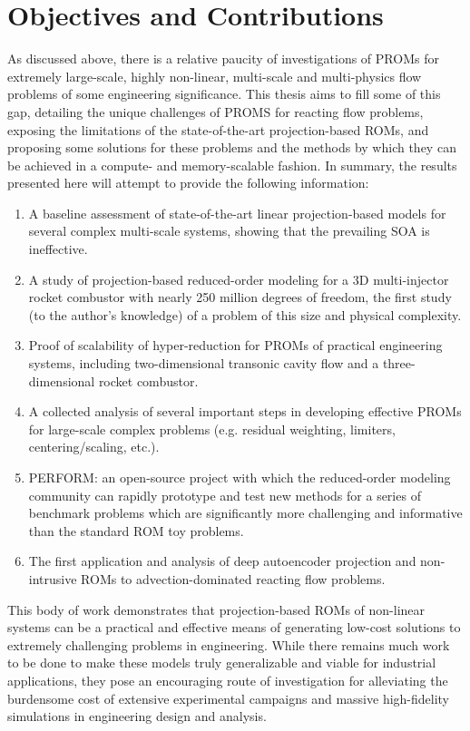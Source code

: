 \section{Objectives and Contributions}

As discussed above, there is a relative paucity of investigations of PROMs for extremely large-scale, highly non-linear, multi-scale and multi-physics flow problems of some engineering significance. This thesis aims to fill some of this gap, detailing the unique challenges of PROMS for reacting flow problems, exposing the limitations of the state-of-the-art projection-based ROMs, and proposing some solutions for these problems and the methods by which they can be achieved in a compute- and memory-scalable fashion. In summary, the results presented here will attempt to provide the following information:

\begin{enumerate}
    \item A baseline assessment of state-of-the-art linear projection-based models for several complex multi-scale systems, showing that the prevailing SOA is ineffective.
    \item A study of projection-based reduced-order modeling for a 3D multi-injector rocket combustor with nearly 250 million degrees of freedom, the first study (to the author's knowledge) of a problem of this size and physical complexity.
    \item Proof of scalability of hyper-reduction for PROMs of practical engineering systems, including two-dimensional transonic cavity flow and a three-dimensional rocket combustor.
    \item A collected analysis of several important steps in developing effective PROMs for large-scale complex problems (e.g. residual weighting, limiters, centering/scaling, etc.).
    \item PERFORM: an open-source project with which the reduced-order modeling community can rapidly prototype and test new methods for a series of benchmark problems which are significantly more challenging and informative than the standard ROM toy problems.
    \item The first application and analysis of deep autoencoder projection and non-intrusive ROMs to advection-dominated reacting flow problems.
\end{enumerate}

This body of work demonstrates that projection-based ROMs of non-linear systems can be a practical and effective means of generating low-cost solutions to extremely challenging problems in engineering. While there remains much work to be done to make these models truly generalizable and viable for industrial applications, they pose an encouraging route of investigation for alleviating the burdensome cost of extensive experimental campaigns and massive high-fidelity simulations in engineering design and analysis.